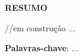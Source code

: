 \makeatletter
    \setlength{\absparsep}{18pt}
\makeatother

\begin{center}
    \textbf{RESUMO}
\end{center}
\vspace{.5cm}

\noindent //em construção
...

\vspace{18pt}\noindent\textbf{Palavras-chave}: ...